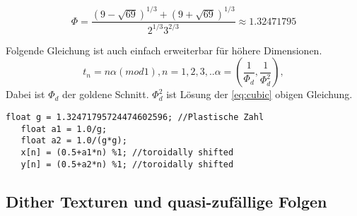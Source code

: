 \begin{equation} \label{eq:plasticnumber}
   \Phi = \frac{(9 - \sqrt{69})^{1/3} + (9 + \sqrt{69})^{1/3}}
               {2^{1/3}3^{2/3}} \approx 1.32471795
\end{equation}

\cite{vanderlaanplasticnumber}
\cite{wolframalphaPlastic}
Folgende Gleichung ist auch einfach erweiterbar für höhere Dimensionen.
\begin{equation}\label{eq:getVektor}
    t_{n} = n\alpha(mod 1), n = 1,2,3,..
    \alpha = (\frac{1}{\Phi_{d}}, \frac{1}{\Phi_{d}^{2}}),
\end{equation}
Dabei ist $\Phi_{d}$ der goldene Schnitt. $\Phi_{d}^{2}$ ist Lösung der
\ref{eq:cubic} obigen Gleichung.


\cite{quasirandomsequencesbyRoberts}
\label{code:golden_ratio}
\begin{lstlisting}[style=CStyle]
   float g = 1.32471795724474602596; //Plastische Zahl
   float a1 = 1.0/g;
   float a2 = 1.0/(g*g);
   x[n] = (0.5+a1*n) %1; //toroidally shifted
   y[n] = (0.5+a2*n) %1; //toroidally shifted
\end{lstlisting}


\subsection{Dither Texturen und quasi-zufällige Folgen}
